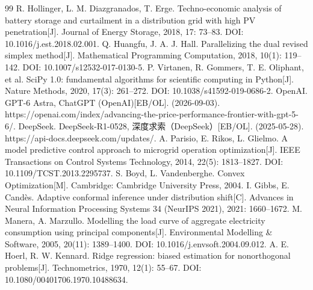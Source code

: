 \begin{thebibliography}{99}
 R. Hollinger, L. M. Diazgranados, T. Erge. Techno-economic analysis of battery storage and curtailment in a distribution grid with high PV penetration[J]. Journal of Energy Storage, 2018, 17: 73--83. DOI: 10.1016/j.est.2018.02.001.
 Q. Huangfu, J. A. J. Hall. Parallelizing the dual revised simplex method[J]. Mathematical Programming Computation, 2018, 10(1): 119--142. DOI: 10.1007/s12532-017-0130-5.
 P. Virtanen, R. Gommers, T. E. Oliphant, et al. SciPy 1.0: fundamental algorithms for scientific computing in Python[J]. Nature Methods, 2020, 17(3): 261--272. DOI: 10.1038/s41592-019-0686-2.
 OpenAI. GPT-6 Astra, ChatGPT (OpenAI)[EB/OL]. (2026-09-03). https://openai.com/index/advancing-the-price-performance-frontier-with-gpt-5-6/.
 DeepSeek. DeepSeek-R1-0528, 深度求索（DeepSeek）[EB/OL]. (2025-05-28). https://api-docs.deepseek.com/updates/.
 A. Parisio, E. Rikos, L. Glielmo. A model predictive control approach to microgrid operation optimization[J]. IEEE Transactions on Control Systems Technology, 2014, 22(5): 1813--1827. DOI: 10.1109/TCST.2013.2295737.
 S. Boyd, L. Vandenberghe. Convex Optimization[M]. Cambridge: Cambridge University Press, 2004.
 I. Gibbs, E. Candès. Adaptive conformal inference under distribution shift[C]. Advances in Neural Information Processing Systems 34 (NeurIPS 2021), 2021: 1660--1672.
 M. Manera, A. Marzullo. Modelling the load curve of aggregate electricity consumption using principal components[J]. Environmental Modelling \& Software, 2005, 20(11): 1389--1400. DOI: 10.1016/j.envsoft.2004.09.012.
 A. E. Hoerl, R. W. Kennard. Ridge regression: biased estimation for nonorthogonal problems[J]. Technometrics, 1970, 12(1): 55--67. DOI: 10.1080/00401706.1970.10488634.
\end{thebibliography}